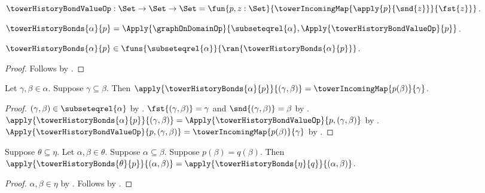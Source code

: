 \begin{definition}\label{tower_history_bond_value_op}
    $\towerHistoryBondValueOp:\Set\to\Set\to\Set
        =\fun{p,z:\Set}{
            \towerIncomingMap
                {\apply{p}{\snd{z}}}{\fst{z}}}$.
\end{definition}

\begin{definition}\label{tower_history_bonds}
    $\towerHistoryBonds{\alpha}{p}=
        \Apply{\graphOnDomainOp}{\subseteqrel{\alpha},
            \Apply{\towerHistoryBondValueOp}{p}}$.
\end{definition}

\begin{proposition}\label{tower_history_bonds_type}
    $\towerHistoryBonds{\alpha}{p}\in
        \funs{\subseteqrel{\alpha}}{
            \ran{\towerHistoryBonds{\alpha}{p}}}$.
\end{proposition}
\begin{proof}
    Follows by
        .
\end{proof}

\begin{proposition}\label{tower_history_bonds_apply}
    Let $\gamma,\beta\in\alpha$.
    Suppose $\gamma\subseteq\beta$.
    Then $\apply{\towerHistoryBonds{\alpha}{p}}{(\gamma,\beta)}=
        \towerIncomingMap{p(\beta)}{\gamma}$.
\end{proposition}
\begin{proof}
    $(\gamma,\beta)\in\subseteqrel{\alpha}$ by
        .
    $\fst{(\gamma,\beta)}=\gamma$ and
        $\snd{(\gamma,\beta)}=\beta$ by
        .
    $\apply{\towerHistoryBonds{\alpha}{p}}{(\gamma,\beta)}
        =\Apply{\towerHistoryBondValueOp}{p,(\gamma,\beta)}$ by
        .
    $\Apply{\towerHistoryBondValueOp}{p,(\gamma,\beta)}=
        \towerIncomingMap{p(\beta)}{\gamma}$ by
        .
\end{proof}

\begin{proposition}\label{tower_history_bonds_apply_congruent}
    Suppose $\theta\subseteq\eta$.
    Let $\alpha,\beta\in\theta$.
    Suppose $\alpha\subseteq\beta$.
    Suppose $p(\beta)=q(\beta)$.
    Then $\apply{\towerHistoryBonds{\theta}{p}}{(\alpha,\beta)}=
        \apply{\towerHistoryBonds{\eta}{q}}{(\alpha,\beta)}$.
\end{proposition}
\begin{proof}
    $\alpha,\beta\in\eta$ by .
    Follows by .
\end{proof}

